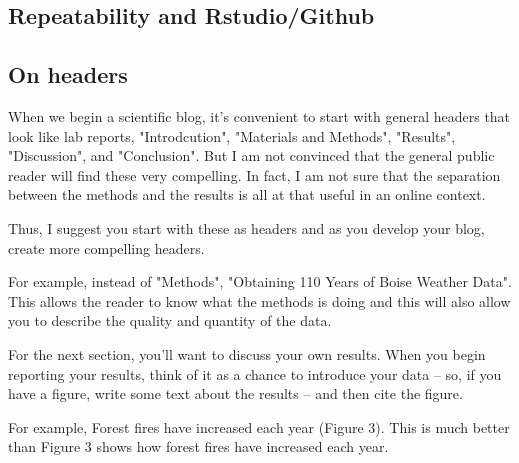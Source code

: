 \documentclass{tufte-handout}\usepackage[]{graphicx}\usepackage[]{color}
\begin{document}
\subsection{Repeatability and Rstudio/Github}



\subsection{On headers}

When we begin a scientific blog, it's convenient to start with general headers that look like lab reports, "Introdcution", "Materials and Methods", "Results", "Discussion", and "Conclusion". But I am not convinced that the general public reader will find these very compelling. In fact, I am not sure that the separation between the methods and the results is all at that useful in an online context. 

Thus, I suggest you start with these as headers and as you develop your blog, create more compelling headers. 

For example, instead of "Methods", "Obtaining 110 Years of Boise Weather Data". This allows the reader to know what the methods is doing and this will also allow you to describe the quality and quantity of the data. 

For the next section, you'll want to discuss your own results. When you begin reporting your results, think of it as a chance to introduce your data -- so, if you have a figure, write some text about the results -- and then cite the figure.

For example, Forest fires have increased each year (Figure 3). 
This is much better than Figure 3 shows how forest fires have increased each year. 





\end{document}
